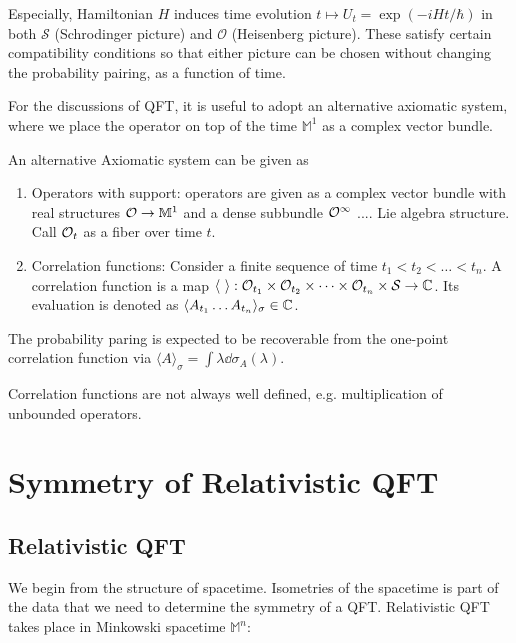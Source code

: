 \documentclass[a4paper,11pt]{article}
\begin{document}
\begin{remark}
    Especially, Hamiltonian $H$ induces time evolution $t\mapsto U_t=\exp(-iHt/\hbar)$ in both $\mathcal{S}$ (Schrodinger picture) and $\mathcal{O}$ (Heisenberg picture). These satisfy certain compatibility conditions so that either picture can be chosen without changing the probability pairing, as a function of time.
\end{remark}
For the discussions of QFT, it is useful to adopt an alternative axiomatic system, where we place the operator on top of the time $\mathbb{M}^1$ as a complex vector bundle.
\begin{statement}
    An alternative Axiomatic system can be given as
    \begin{enumerate}
        \item[2'.] Operators with support: operators are given as a complex vector bundle with real structures $\mathcal{O} \to {\mathbb{M}^1}$ and a dense subbundle $\mathcal{O}^{\infty}$ .... Lie algebra structure. Call $\mathcal{O}_t$ as a fiber over time $t$. 
        \item[4'.] Correlation functions: Consider a finite sequence of time $t_1 < t_2 < \dots < t_n$. A correlation function is a map $\langle ~ \rangle: \mathcal{O}_{t_1} \times \mathcal{O}_{t_2} \times \dots \times \mathcal{O}_{t_n} \times \mathcal{S} \to \mathbb{C}$. Its evaluation is denoted as $\langle A_{t_1}\dots A_{t_n}\rangle_\sigma \in \mathbb{C}$.
    \end{enumerate}
\end{statement}
\begin{remark}
        The probability paring is expected to be recoverable from the one-point correlation function via $\langle A\rangle_\sigma = \int \lambda \dd \sigma_A(\lambda)$.
\end{remark}
\begin{remark}
    Correlation functions are not always well defined, e.g. multiplication of unbounded operators.
\end{remark}


\section{Symmetry of Relativistic QFT}
\subsection{Relativistic QFT}
We begin from the structure of spacetime. Isometries of the spacetime is part of the data that we need to determine the symmetry of a QFT. Relativistic QFT takes place in Minkowski spacetime $\mathbb{M}^n$:
\end{document}
